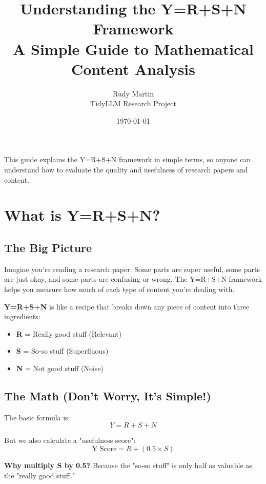 \documentclass[11pt,a4paper]{article}
\title{\textbf{Understanding the Y=R+S+N Framework}\\
\large{A Simple Guide to Mathematical Content Analysis}}
\author{Rudy Martin \\ TidyLLM Research Project}
\date{\today}
\begin{document}
\maketitle

\begin{tcolorbox}[colback=infoblue!10,colframe=infoblue,title=What You'll Learn]
This guide explains the Y=R+S+N framework in simple terms, so anyone can understand how to evaluate the quality and usefulness of research papers and content.
\end{tcolorbox}

\tableofcontents
\newpage

\section{What is Y=R+S+N?}

\subsection{The Big Picture}
Imagine you're reading a research paper. Some parts are super useful, some parts are just okay, and some parts are confusing or wrong. The Y=R+S+N framework helps you measure how much of each type of content you're dealing with.

\begin{tcolorbox}[colback=successgreen!10,colframe=successgreen,title=Simple Definition]
\textbf{Y=R+S+N} is like a recipe that breaks down any piece of content into three ingredients:
\begin{itemize}
\item \textbf{R} = Really good stuff (Relevant)
\item \textbf{S} = So-so stuff (Superfluous) 
\item \textbf{N} = Not good stuff (Noise)
\end{itemize}
\end{tcolorbox}

\subsection{The Math (Don't Worry, It's Simple!)}

The basic formula is:
\[ Y = R + S + N \]

But we also calculate a "usefulness score":
\[ \text{Y Score} = R + (0.5 \times S) \]

\textbf{Why multiply S by 0.5?} Because the "so-so stuff" is only half as valuable as the "really good stuff."
\end{document}
